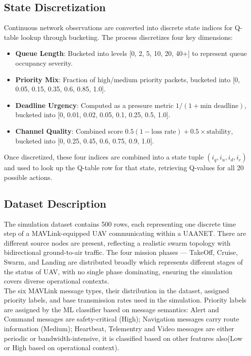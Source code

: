 \documentclass[pdflatex,sn-mathphys-num]{sn-jnl}%
\theoremstyle{thmstyleone}%
\theoremstyle{thmstyletwo}%
\theoremstyle{thmstylethree}%
\begin{document}
\subsection{ State Discretization }

Continuous network observations are converted into discrete state indices for Q-table lookup through bucketing. The process discretizes four key dimensions:

\begin{itemize}
    \item \textbf{Queue Length}: Bucketed into levels [0, 2, 5, 10, 20, 40+] to represent queue occupancy severity.
    \item \textbf{Priority Mix}: Fraction of high/medium priority packets, bucketed into [0, 0.05, 0.15, 0.35, 0.6, 0.85, 1.0].
    \item \textbf{Deadline Urgency}: Computed as a pressure metric $1 / (1 + \text{min deadline})$, bucketed into [0, 0.01, 0.02, 0.05, 0.1, 0.25, 0.5, 1.0].
    \item \textbf{Channel Quality}: Combined score $0.5(1 - \text{loss rate}) + 0.5 \times \text{stability}$, bucketed into [0, 0.25, 0.45, 0.6, 0.75, 0.9, 1.0].
\end{itemize}

Once discretized, these four indices are combined into a state tuple $(i_q, i_u, i_d, i_c)$ and used to look up the Q-table row for that state, retrieving Q-values for all 20 possible actions.

\subsection{ Dataset Description}
The simulation dataset contains 500 rows, each representing one discrete time step of a MAVLink-equipped UAV communicating within a UAANET.
There are different source nodes are present, reflecting a realistic swarm topology with bidirectional ground-to-air traffic. The four mission phases — TakeOff, Cruise, Swarm, and Landing are distributed broadly which represents different stages of the status of UAV, with no single phase dominating, ensuring the simulation covers diverse operational contexts. \\ 

The six MAVLink message types, their distribution in the dataset, assigned priority labels, and base transmission rates used in the simulation. Priority labels are assigned by the ML classifier based on message semantics: Alert and Command messages are safety-critical (High); Navigation messages carry route information (Medium); Heartbeat, Telementry and Video messages are either periodic or bandwidth-intensive, it is classified based on other features also(Low or High based on operational context).
\end{document}
